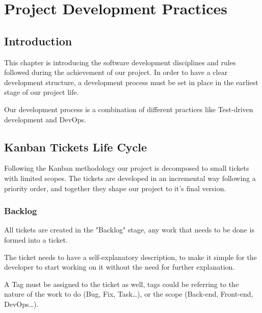 
\setcounter{chapter}{1}
\chapter{Project Development Practices}
\minitoc %
\graphicspath{{Chapter2/figures/}}


\pagestyle{fancy}
\fancyhf{}
\fancyhead[R]{\bfseries\rightmark}
\fancyfoot[R]{\thepage}
\renewcommand{\headrulewidth}{0.5pt}
\renewcommand{\footrulewidth}{0pt}
\renewcommand{\chaptermark}[1]{\markboth{\MakeUppercase{\chaptername~\thechapter. #1 }}{}}
\renewcommand{\sectionmark}[1]{\markright{\thechapter.\thesection~ #1}}

\begin{spacing}{1.2}
\section*{Introduction}
This chapter is introducing the software development disciplines and rules followed during the achievement of our project. In order to have a clear development structure, a development process must be set in place in the earliest stage of our project life.

Our development process is a combination of different practices like Test-driven development and DevOps.

\section{Kanban Tickets Life Cycle}
Following the Kanban methodology our project is decomposed to small tickets with limited scopes. The tickets are developed in an incremental way following a priority order, and together they shape our project to it's final version.
\subsection{Backlog}
All tickets are created in the "Backlog" stage, any work that needs to be done is formed into a ticket.


The ticket needs to have a self-explanatory description, to make it simple for the developer to start working on it without the need for further explanation.

A Tag must be assigned to the ticket as well, tags could be referring to the nature of the work to do (Bug, Fix, Task\dots), or the scope (Back-end, Front-end, DevOps\dots).


\end{spacing}
